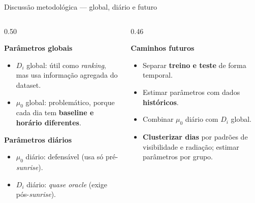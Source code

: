 \documentclass[aspectratio=169, 11pt]{beamer}
\begin{document}
\begin{frame}{Discussão metodológica --- global, diário e futuro}

\begin{columns}[T]
\begin{column}{0.50\textwidth}

\textbf{Parâmetros globais}
\begin{itemize}
  \item $D_i$ global: útil como \emph{ranking}, mas usa
        informação agregada do dataset.
  \item $\mu_0$ global: problemático, porque cada dia tem
        \textbf{baseline e horário diferentes}.
\end{itemize}

\vspace{0.4em}
\textbf{Parâmetros diários}
\begin{itemize}
  \item $\mu_0$ diário: defensável (usa só pré-\textit{sunrise}).
  \item $D_i$ diário: \emph{quase oracle} (exige pós-\textit{sunrise}).
\end{itemize}

\end{column}
\begin{column}{0.46\textwidth}

\textbf{Caminhos futuros}
\begin{itemize}
  \item Separar \textbf{treino e teste} de forma temporal.
  \item Estimar parâmetros com dados \textbf{históricos}.
  \item Combinar $\mu_0$ diário com $D_i$ global.
  \item \textbf{Clusterizar dias} por padrões de visibilidade
        e radiação; estimar parâmetros por grupo.
\end{itemize}

\end{column}
\end{columns}

\end{frame}
\end{document}
